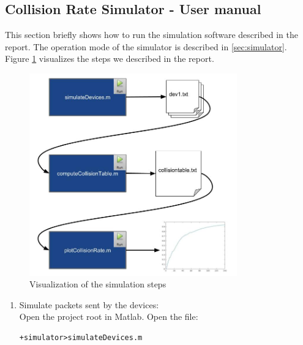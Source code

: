 \documentclass{article}
\begin{document}
\newpage
\begin{appendices}

        \section{Collision Rate Simulator - User manual}
        This section briefly shows how to run the simulation software described
        in the report. The operation mode of the simulator is described in
        \ref{sec:simulator}. Figure \ref{fig:simulation} visualizes the steps
        we described in the report.

        \begin{figure}[h] \centering
            \includegraphics[width=0.8\textwidth]{./figures/simulation}
            \caption{Visualization of the simulation steps}
            \label{fig:simulation}
        \end{figure}

        \begin{enumerate}
                \item Simulate packets sent by the devices:\\
                        Open the project root in Matlab. Open the file:
                        
\begin{verbatim}
+simulator>simulateDevices.m
\end{verbatim}
                        

\end{enumerate}
\end{appendices}
\end{document}
